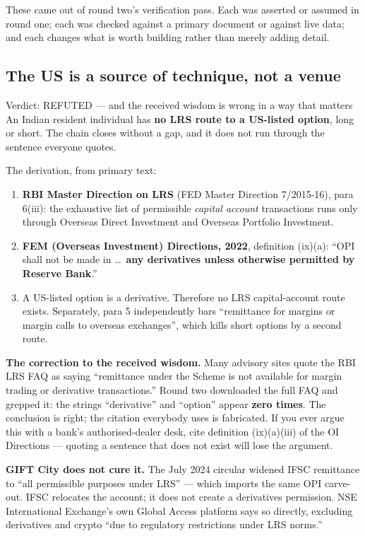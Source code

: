 \documentclass[11pt,a4paper]{article}
\begin{document}
These came out of round two's verification pass. Each was asserted or assumed in
round one; each was checked against a primary document or against live data; and
each changes what is worth building rather than merely adding detail.

\subsection{The US is a source of technique, not a venue}
\label{sec:lrs}

\begin{keyfact}{Verdict: REFUTED --- and the received wisdom is wrong in a way that matters}
An Indian resident individual has \textbf{no LRS route to a US-listed option},
long or short. The chain closes without a gap, and it does not run through the
sentence everyone quotes.
\end{keyfact}

The derivation, from primary text:

\begin{enumerate}
\item \textbf{RBI Master Direction on LRS} (FED Master Direction 7/2015-16),
para 6(iii): the exhaustive list of permissible \emph{capital account}
transactions runs only through Overseas Direct Investment and Overseas Portfolio
Investment.
\item \textbf{FEM (Overseas Investment) Directions, 2022}, definition (ix)(a):
``OPI shall not be made in \ldots\ \textbf{any derivatives unless otherwise
permitted by Reserve Bank}.''
\item A US-listed option is a derivative. Therefore no LRS capital-account route
exists. Separately, para 5 independently bars ``remittance for margins or margin
calls to overseas exchanges'', which kills short options by a second route.
\end{enumerate}

\textbf{The correction to the received wisdom.} Many advisory sites quote the RBI
LRS FAQ as saying ``remittance under the Scheme is not available for margin
trading or derivative transactions.'' Round two downloaded the full FAQ and
grepped it: the strings ``derivative'' and ``option'' appear \textbf{zero times}.
The conclusion is right; the citation everybody uses is fabricated. If you ever
argue this with a bank's authorised-dealer desk, cite definition (ix)(a)(iii) of
the OI Directions --- quoting a sentence that does not exist will lose the argument.

\textbf{GIFT City does not cure it.} The July 2024 circular widened IFSC
remittance to ``all permissible purposes under LRS'' --- which imports the same
OPI carve-out. IFSC relocates the account; it does not create a derivatives
permission. NSE International Exchange's own Global Access platform says so
directly, excluding derivatives and crypto ``due to regulatory restrictions under
LRS norms.''
\end{document}
